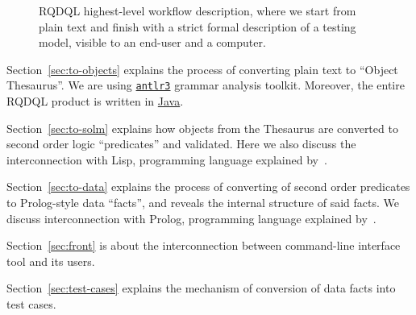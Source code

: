 \documentclass[12pt,oneside,letterpaper]{article}
\begin{document}
    \begin{figure}[ht]
        \caption{RQDQL highest-level workflow description, where we start
            from plain text and finish with a strict formal description
            of a testing model, visible to an end-user and a computer.}
        \label{fig:Workflow}
    \end{figure}

    Section~\ref{sec:to-objects} explains the process of converting plain text
    to ``Object Thesaurus''. We are using
    \href{http://www.altlr.org}{\texttt{antlr3}} grammar analysis toolkit.
    Moreover, the entire RQDQL product is written in \href{http://www.java.com/en/}{Java}.

    Section~\ref{sec:to-solm} explains how objects from the Thesaurus are converted to
    second order logic ``predicates''
    and validated. Here we also discuss the interconnection with
    Lisp, programming language explained by~\cite{graham93}.

    Section~\ref{sec:to-data} explains the process of converting of
    second order predicates to Prolog-style data ``facts'', and reveals the internal
    structure of said facts. We discuss interconnection with Prolog,
    programming language explained by~\cite{shapiro94}.

    Section~\ref{sec:front} is about the interconnection between 
    command-line interface tool and its users.

    Section~\ref{sec:test-cases} explains the mechanism of conversion
    of data facts into test cases.
\end{document}
